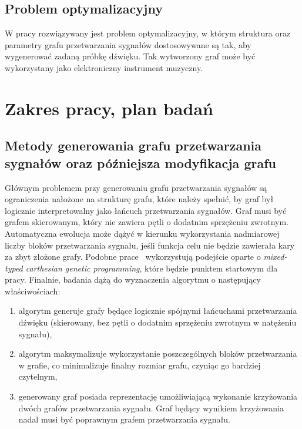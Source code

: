 \subsection{Problem optymalizacyjny}

W pracy rozwiązywany jest problem optymalizacyjny, w którym
struktura oraz parametry grafu przetwarzania sygnałów dostosowywane
są tak, aby wygenerować zadaną próbkę dźwięku. Tak wytworzony
graf może być wykorzystany jako elektroniczny instrument muzyczny. 





\section{Zakres pracy, plan badań}\label{chap:thesis_scope}

\subsection{Metody generowania grafu przetwarzania sygnałów oraz późniejsza modyfikacja grafu}

Głównym problemem przy generowaniu grafu przetwarzania sygnałów są ograniczenia nałożone na strukturę grafu,
które należy spełnić, by graf był logicznie interpretowalny jako łańcuch przetwarzania sygnałów.
Graf musi być grafem skierowanym, który nie zawiera pętli o dodatnim sprzężeniu zwrotnym.
Automatyczna ewolucja może dążyć w kierunku wykorzystania nadmiarowej liczby
bloków przetwarzania sygnału, jeśli funkcja celu nie będzie zawierała kary za zbyt złożone grafy.
Podobne prace~\cite{evolutionary_puredata} wykorzystują podejście oparte o 
\textit{mixed-typed carthesian genetic programming}, które będzie punktem startowym dla pracy.
Finalnie, badania dążą do wyznaczenia algorytmu o następujący właściwościach:

\begin{enumerate}
    \item algorytm generuje grafy będące logicznie spójnymi łańcuchami przetwarzania dźwięku (skierowany, bez pętli o dodatnim sprzężeniu zwrotnym w natężeniu sygnału),
    \item algorytm maksymalizuje wykorzystanie poszczególnych bloków przetwarzania w grafie, co minimalizuje finalny rozmiar grafu, czyniąc go bardziej czytelnym,
    \item generowany graf posiada reprezentację umożliwiającą wykonanie krzyżowania dwóch grafów przetwarzania sygnału. Graf będący wynikiem krzyżowania nadal musi być poprawnym grafem przetwarzania sygnału.
\end{enumerate}

